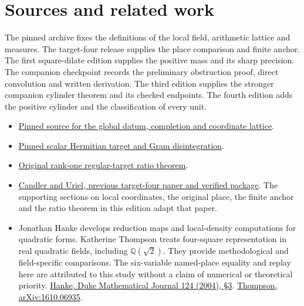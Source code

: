 \documentclass[12pt,letterpaper]{article}
\begin{document}
\section*{Sources and related work}
\begingroup\small
The pinned archive fixes the definitions of the local field, arithmetic lattice and measures. The target-four release supplies the place comparison and finite anchor. The first square-dilate edition supplies the positive mass and its sharp precision. The companion checkpoint records the preliminary obstruction proof, direct convolution and written derivation. The third edition supplies the stronger companion cylinder theorem and its checked endpoints. The fourth edition adds the positive cylinder and the classification of every unit.
\begin{itemize}
\item \href{https://github.com/nousentllc/riemann-hypothesis/blob/40e56bab026552e089d7afcfeff08d2defb9c005/src/Formalism/SharpRestriction/GlobalSchurBounds/GeneralLinearActions/GenusMassVolumes.lean}{Pinned source for the global datum, completion and coordinate lattice}.
\item \href{https://github.com/nousentllc/riemann-hypothesis/blob/40e56bab026552e089d7afcfeff08d2defb9c005/src/CompanionTheory/SpectralGeometry/CountingDefinitions/AdelicEulerProducts/IsEulerProd.lean}{Pinned scalar Hermitian target and Gram disintegration}.
\item \href{https://github.com/nousentllc/riemann-hypothesis/blob/40e56bab026552e089d7afcfeff08d2defb9c005/src/CompanionTheory/SpectralGeometry/LocalGlobalProofs/AdelicAnalysis/LocalGramFiberRankOneSetFormula.lean#L310}{Original rank-one regular-target ratio theorem}.
\item \href{https://github.com/nousentllc/riemann-hypothesis/tree/63c06fe44eb700e4550e4a2b70adafe09cb1ff9b/research/uriel/experiments/ramified-gram-bridge}{Candler and Uriel, previous target-four paper and verified package}. The supporting sections on local coordinates, the original place, the finite anchor and the ratio theorem in this edition adapt that paper.
\item Jonathan Hanke develops reduction maps and local-density computations for quadratic forms. Katherine Thompson treats four-square representation in real quadratic fields, including $\mathbb Q(\sqrt2)$. They provide methodological and field-specific comparisons. The six-variable named-place equality and replay here are attributed to this study without a claim of numerical or theoretical priority. \href{https://www.jonhanke.com/Hanke--all_papers__as_of_2015-01-14/explicit-bounds-paper.pdf}{Hanke, Duke Mathematical Journal 124 (2004), §3}. \href{https://arxiv.org/abs/1610.06935}{Thompson, arXiv:1610.06935}.

\end{itemize}
\end{document}
